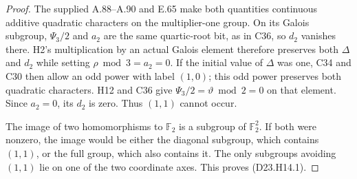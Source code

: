 \begin{proof}
The supplied A.88--A.90 and E.65 make both quantities
continuous additive quadratic characters on the
multiplier-one group. On its Galois subgroup,
$\Psi_3/2$ and $a_2$ are the same quartic-root bit,
as in C36, so $d_2$ vanishes there. H2's multiplication
by an actual Galois element therefore preserves both
$\Delta$ and $d_2$ while setting $\rho\bmod3=a_2=0$.
If the initial value of $\Delta$ was one, C34 and C30
then allow an odd power with label $(1,0)$; this odd
power preserves both quadratic characters. H12 and C36
give $\Psi_3/2=\vartheta\bmod2=0$ on that element.
Since $a_2=0$, its $d_2$ is zero. Thus $(1,1)$ cannot occur.

The image of two homomorphisms to $\mathbb F_2$ is a
subgroup of $\mathbb F_2^2$. If both were nonzero, the
image would be either the diagonal subgroup, which
contains $(1,1)$, or the full group, which also contains
it. The only subgroups avoiding $(1,1)$ lie on one of
the two coordinate axes. This proves (D23.H14.1).
\end{proof}
